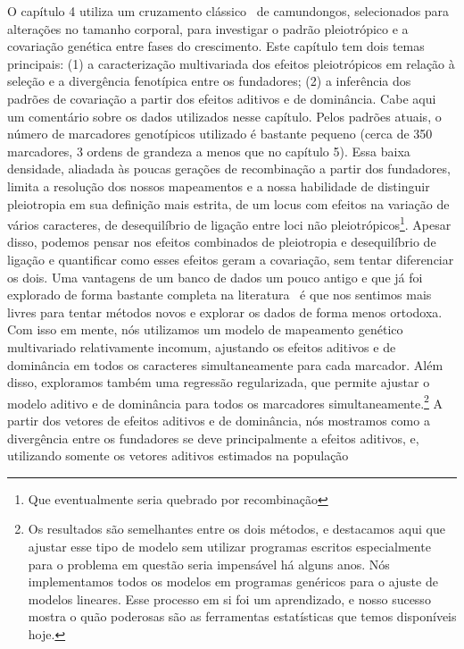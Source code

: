 \begin{refsection}
O capítulo 4 utiliza um cruzamento clássico~\parencite[descrito
em][]{Cheverud1996-fm} de camundongos, selecionados para alterações no tamanho
corporal, para investigar o padrão pleiotrópico e a covariação genética entre
fases do crescimento. Este capítulo tem dois temas principais: (1) a
caracterização multivariada dos efeitos pleiotrópicos em relação à seleção e a divergência
fenotípica entre os fundadores; (2) a inferência dos padrões de covariação a
partir dos efeitos aditivos e de dominância. Cabe aqui um comentário sobre os
dados utilizados nesse capítulo. Pelos padrões atuais, o número de marcadores
genotípicos utilizado é bastante pequeno (cerca de 350 marcadores, 3 ordens de
grandeza a menos que no capítulo 5). Essa baixa densidade, aliadada às poucas
gerações de recombinação a partir dos fundadores, limita a resolução dos
nossos mapeamentos e a nossa habilidade de distinguir pleiotropia em sua
definição mais estrita, de um locus com efeitos na variação de vários
caracteres, de desequilíbrio de ligação entre loci não
pleiotrópicos\footnote{Que eventualmente seria quebrado por recombinação}.
Apesar disso, podemos pensar nos efeitos combinados de pleiotropia e
desequilíbrio de ligação e quantificar como esses efeitos geram a covariação,
sem tentar diferenciar os dois. Uma vantagens de um banco de dados um pouco
antigo e que já foi explorado de forma bastante completa na
literatura~\parencite{Cheverud1996-fm, Kramer1998-cc, Hager2009-mz,
Vaughn1999-wt, Leamy2002-nh, Wolf2005-nr, Mitteroecker2016-vq} é que nos
sentimos mais livres para tentar métodos novos e explorar os dados de forma
menos ortodoxa. Com isso em mente, nós utilizamos um modelo de mapeamento
genético multivariado relativamente incomum, ajustando os efeitos aditivos e
de dominância em todos os caracteres simultaneamente para cada marcador. Além
disso, exploramos também uma regressão regularizada, que permite ajustar o
modelo aditivo e de dominância para todos os marcadores
simultaneamente.\footnote{Os resultados são semelhantes entre os dois métodos,
e destacamos aqui que ajustar esse tipo de modelo sem utilizar programas
escritos especialmente para o problema em questão seria impensável há alguns
anos. Nós implementamos todos os modelos em programas genéricos para o ajuste
de modelos lineares. Esse processo em si foi um aprendizado, e nosso sucesso
mostra o quão poderosas são as ferramentas estatísticas que temos disponíveis
hoje.} A partir dos vetores de efeitos aditivos e de dominância, nós mostramos
como a divergência entre os fundadores se deve principalmente a efeitos
aditivos, e, utilizando somente os vetores aditivos estimados na população

\end{refsection}
